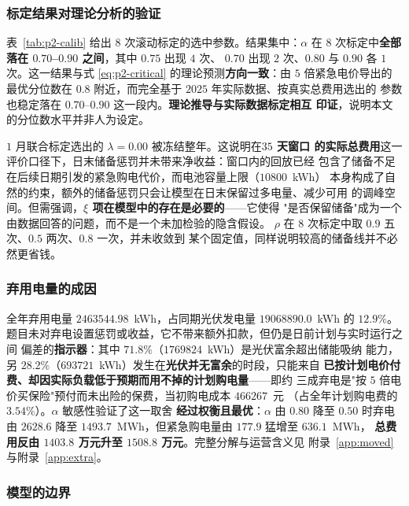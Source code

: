 \documentclass[withoutpreface,bwprint]{cumcmthesis}
\begin{document}
\subsubsection{标定结果对理论分析的验证}

表~\ref{tab:p2-calib} 给出 $8$ 次滚动标定的选中参数。结果集中：$\alpha$ 在
$8$ 次标定中\textbf{全部落在 $0.70$--$0.90$ 之间}，其中 $0.75$ 出现 $4$ 次、
$0.70$ 出现 $2$ 次、$0.80$ 与 $0.90$ 各 $1$ 次。这一结果与式
\eqref{eq:p2-critical} 的理论预测\textbf{方向一致}：由 $5$ 倍紧急电价导出的
最优分位数在 $0.8$ 附近，而完全基于 $2025$ 年实际数据、按真实总费用选出的
参数也稳定落在 $0.70$--$0.90$ 这一段内。\textbf{理论推导与实际数据标定相互
印证}，说明本文的分位数水平并非人为设定。

$1$ 月联合标定选出的 $\lambda=0.00$ 被冻结整年。这说明在\textbf{$35$ 天窗口
的实际总费用}这一评价口径下，日末储备惩罚并未带来净收益：窗口内的回放已经
包含了储备不足在后续日期引发的紧急购电代价，而电池容量上限（$10800$~kWh）
本身构成了自然的约束，额外的储备惩罚只会让模型在日末保留过多电量、减少可用
的调峰空间。但需强调，\textbf{$\xi$ 项在模型中的存在是必要的}——它使得
"是否保留储备"成为一个由数据回答的问题，而不是一个未加检验的隐含假设。
$\rho$ 在 $8$ 次标定中取 $0.9$ 五次、$0.5$ 两次、$0.8$ 一次，并未收敛到
某个固定值，同样说明较高的储备线并不必然更省钱。

\subsubsection{弃用电量的成因}

全年弃用电量 $2463544.98$~kWh，占同期光伏发电量 $19068890.0$~kWh 的 $12.9\%$。
题目未对弃电设置惩罚或收益，它不带来额外扣款，但仍是日前计划与实时运行之间
偏差的\textbf{指示器}：其中 $71.8\%$（$1769824$~kWh）是光伏富余超出储能吸纳
能力，另 $28.2\%$（$693721$~kWh）发生在\textbf{光伏并无富余}的时段，只能来自
\textbf{已按计划电价付费、却因实际负载低于预期而用不掉的计划购电量}——即约
三成弃电是"按 $5$ 倍电价买保险"预付而未出险的保费，当初购电成本 $466267$~元
（占全年计划购电费的 $3.54\%$）。$\alpha$ 敏感性验证了这一取舍
\textbf{经过权衡且最优}：$\alpha$ 由 $0.80$ 降至 $0.50$ 时弃电由 $2628.6$ 降至
$1493.7$~MWh，但紧急购电量由 $177.9$ 猛增至 $636.1$~MWh，
\textbf{总费用反由 $1403.8$ 万元升至 $1508.8$ 万元}。完整分解与运营含义见
附录~\ref{app:moved} 与附录~\ref{app:extra}。

\subsubsection{模型的边界}
\end{document}
